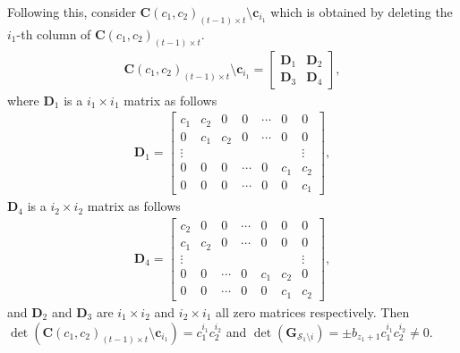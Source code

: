 \documentclass[journal,twocolumn]{IEEEtran}
\theoremstyle{definition}
\newcommand{\calS}{\mathcal{S}}
\newcommand{\bfc}{\mathbf{c}}
\newcommand{\bfG}{\mathbf{G}}
\newcommand{\bfC}{\mathbf{C}}
\newcommand{\bfD}{\mathbf{D}}
\begin{document}
\begin{itemize}
Following this, consider $\bfC(c_1, c_2)_{(t-1)\times t}\setminus \bfc_{i_1}$ which is obtained by deleting the $i_1$-th column of $\bfC(c_1, c_2)_{(t-1)\times t}$. %
	\begin{align*}
		\bfC(c_1, c_2)_{(t-1)\times t}\setminus \bfc_{i_1} = \begin{bmatrix}
			\bfD_1 & \bfD_2\\
			\bfD_3 & \bfD_4
		\end{bmatrix},
	\end{align*}
	where $\bfD_1$ is a $i_1\times i_1$ matrix as follows
	\begin{align*}
		\bfD_1=\begin{bmatrix}
			c_1 & c_2 & 0 & 0 &\cdots&0 & 0\\
			0 & c_1 & c_2 & 0 &\cdots&0 & 0\\
			\vdots&&&&&&\vdots\\
			0 & 0 & 0 & \cdots & 0 &c_1 & c_2\\
			0 & 0 & 0 & \cdots & 0 &0 & c_1
		\end{bmatrix},
	\end{align*}
	$\bfD_4$ is a $i_2\times i_2$ matrix as follows
	\begin{align*}
		\bfD_4=\begin{bmatrix}
			c_2 & 0 & 0 & \cdots & 0 &0 & 0\\
			c_1 & c_2 & 0 & \cdots &0&0 & 0\\
			\vdots&&&&&&\vdots\\
			0 & 0 & \cdots & 0 & c_1 &c_2 & 0\\
			0 & 0 & \cdots & 0 & 0 &c_1 & c_2
		\end{bmatrix},
	\end{align*}
	and $\bfD_2$ and $\bfD_3$ are $i_1\times i_2$ and $i_2\times i_1$ all zero matrices respectively. Then $\det(\bfC(c_1, c_2)_{(t-1)\times t}\setminus \bfc_{i_1})=c_1^{i_1}c_2^{i_2}$ and $\det(\bfG_{\calS_1\setminus i}) = \pm b_{z_1+1}c_1^{i_1}c_2^{i_2} \neq 0$. %
	

\end{itemize}
\end{document}
